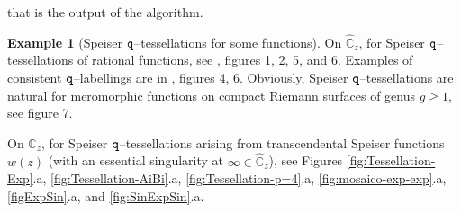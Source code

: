 \documentclass[final,3p,times]{elsarticle}
\newcommand{\CC}{\ensuremath{{\mathbb C}}}
\newcommand{\CW}{\ensuremath{{\widehat{\mathbb C}}}}
\theoremstyle{definition}
\newtheorem{example}{Example}[section]
\begin{document}
\noindent
that is the output of the algorithm.

\begin{example}[Speiser $\tt q$--tessellations for some functions]
On $\CW_z$, 
for Speiser $\tt q$--tessellations of rational functions, 
see \cite{AlvarezGutierrezMucino}, figures 1, 2, 5, and 6. 
Examples of consistent $\tt q$--labellings are in 
\cite{GonzalezMucino}, figures 4, 6.
Obviously, Speiser $\tt q$--tessellations are natural for
meromorphic functions on compact Riemann surfaces
of genus $g\geq 1$, 
see \cite{AlvarezGutierrezMucino} figure 7.


\noindent
On $\CC_z$, for Speiser $\tt q$--tessellations arising from transcendental Speiser functions $w(z)$ 
(with an essential singularity at $\infty\in\CW_z$), 
see Figures 
\ref{fig:Tessellation-Exp}.a,
\ref{fig:Tessellation-AiBi}.a, 
\ref{fig:Tessellation-p=4}.a,
\ref{fig:mosaico-exp-exp}.a, 
\ref{figExpSin}.a, 
and
\ref{fig:SinExpSin}.a.
\end{example}
\end{document}

